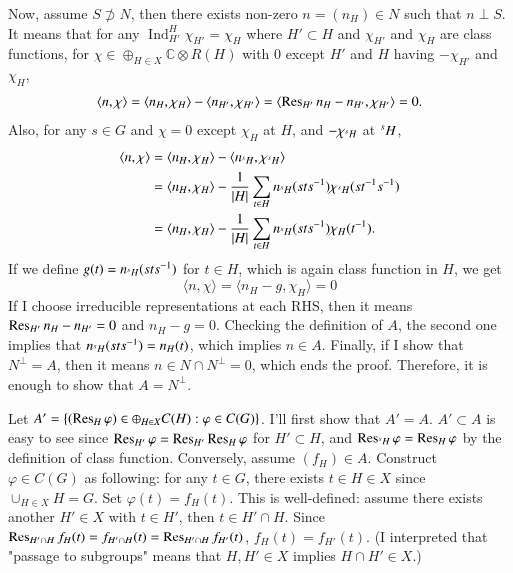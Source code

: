 \documentclass[a4paper, 12pt]{article}
\theoremstyle{Mydefinition}
\theoremstyle{Mytheorem}
\DeclareMathOperator{\Ind}{Ind}
\begin{document}
\begin{enumerate}
    Now, assume $S\not\supset N$, then there exists non-zero $n=(n_H)\in N$ such that $n\perp S$. It means that for any $\Ind_{H'}^H\chi_{H'} = \chi_H$ where $H'\subset H$ and $\chi_{H'}$ and $\chi_H$ are class functions, for $\chi\in \oplus_{H\in X}\mathbb{C}\otimes R(H)$ with $0$ except $H'$ and $H$ having $-\chi_{H'}$ and $\chi_H$,
    \begin{equation}\label{Eq:HW8:1}
    \begin{split}
        \langle n, \chi\rangle = \langle n_H, \chi_H \rangle - \langle n_{H'}, \chi_{H'}\rangle = \langle \Res_{H'} n_H - n_{H'}, \chi_{H'}\rangle = 0.
    \end{split}
    \end{equation}
    Also, for any $s\in G$ and $\chi=0$ except $\chi_H$ at $H$, and $-\chi_{\prescript{s}{\phantom{s}}{H}}$ at $\prescript{s}{\phantom{s}}{H}$,
    \begin{equation}\label{Eq:HW8:2}
    \begin{split}
        \langle n, \chi\rangle &= \langle n_H, \chi_{H}\rangle - \langle n_{\prescript{s}{\phantom{s}}{H}},  \chi_{\prescript{s}{\phantom{s}}{H}}\rangle \\
        &=\langle n_H, \chi_{H}\rangle - \frac{1}{\abs{H}}\sum_{t\in H}n_{\prescript{s}{\phantom{s}}{H}}(sts^{-1})\chi_{\prescript{s}{\phantom{s}}{H}}(st^{-1}s^{-1})\\
        &=\langle n_H, \chi_{H}\rangle - \frac{1}{\abs{H}}\sum_{t\in H}n_{\prescript{s}{\phantom{s}}{H}}(sts^{-1})\chi_{H}(t^{-1}).
    \end{split}
    \end{equation}
    If we define $g(t) = n_{\prescript{s}{\phantom{s}}{H}}(sts^{-1})$ for $t\in H$, which is again class function in $H$, we get
    \begin{equation}\label{Eq:HW8:3}
        \langle n, \chi\rangle = \langle n_H-g, \chi_H\rangle = 0
    \end{equation}
    If I choose irreducible representations at each RHS, then it means $\Res_{H'} n_H - n_{H'} = 0$ and $n_H - g = 0$. Checking the definition of $A$, the second one implies that $n_{\prescript{s}{\phantom{s}}{H}}(sts^{-1}) = n_H(t)$, which implies $n\in A$. Finally, if I show that $N^\perp = A$, then it means $n\in N\cap N^\perp = 0$, which ends the proof. Therefore, it is enough to show that $A=N^\perp$.
    
    Let $A' = \{(\Res_H\varphi)\in \oplus_{H\in X}C(H):\varphi\in C(G)\}$. I'll first show that $A'=A$. $A'\subset A$ is easy to see since $\Res_{H'}\varphi = \Res_{H'}\Res_{H}\varphi$ for $H'\subset H$, and $\Res_{\prescript{s}{\phantom{s}}{H}}\varphi = \Res_{H}\varphi$ by the definition of class function. Conversely, assume $(f_H)\in A$. Construct $\varphi\in C(G)$ as following: for any $t\in G$, there exists $t\in H\in X$ since $\cup_{H\in X}H = G$. Set $\varphi(t) = f_H(t)$. This is well-defined: assume there exists another $H'\in X$ with $t\in H'$, then $t\in H'\cap H$. Since $\Res_{H'\cap H}f_{H}(t) = f_{H'\cap H}(t) = \Res_{H'\cap H}f_{H'}(t)$, $f_H(t)=f_{H'}(t)$. (I interpreted that "passage to subgroups" means that $H,H'\in X$ implies $H\cap H'\in X$.)
    

\end{enumerate}
\end{document}
